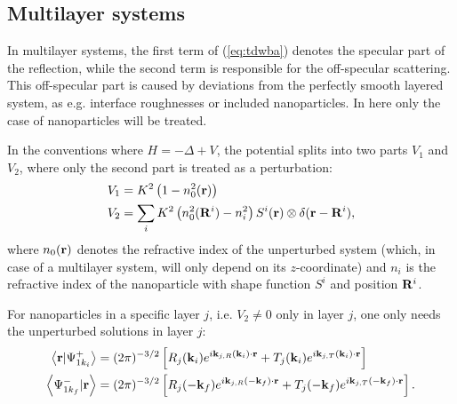 \subsection{Multilayer systems}

In multilayer systems, the first term of (\ref{eq:tdwba}) denotes the specular part of the reflection, while the second term is responsible for the off-specular scattering. This off-specular part is caused by deviations from the perfectly smooth layered system, as e.g. interface roughnesses or included nanoparticles. In here only the case of nanoparticles will be treated.

In the conventions where $H=-\Delta + V$, the potential splits into two parts $V_1$ and $V_2$, where only the second part is treated as a perturbation:
\begin{align*}
  V_1 & = K^2\left( 1-n_0^2(\mathbf{r})\right)  \\
  V_2 & = \sum_i K^2\left( n_0^2(\mathbf{R}^i) - n_i^2 \right) S^i(\mathbf{r}) \otimes \delta(\mathbf{r}-\mathbf{R}^i),
\end{align*}
where $n_0(\mathbf{r})$ denotes the refractive index of the unperturbed system (which, in case of a multilayer system, will only depend on its $z$-coordinate) and $n_i$ is the refractive index of the nanoparticle with shape function $S^i$ and position $\mathbf{R}^i$.

For nanoparticles in a specific layer $j$, i.e. $V_2\neq0$ only in layer $j$, one only needs the unperturbed solutions in layer $j$:
\begin{align*}
  \left\langle \mathbf{r} \vert \Psi^+_{1k_i} \right\rangle &= (2\pi)^{-3/2}\left[ R_j(\mathbf{k}_i) e^{i \mathbf{k}_{j,R}(\mathbf{k}_i)\cdot\mathbf{r}} + T_j(\mathbf{k}_i) e^{i \mathbf{k}_{j,T}(\mathbf{k}_i)\cdot\mathbf{r}} \right] \\
  \left\langle \Psi^-_{1k_f} \vert \mathbf{r} \right\rangle &= (2\pi)^{-3/2}\left[ R_j(-\mathbf{k}_f) e^{i \mathbf{k}_{j,R}(-\mathbf{k}_f)\cdot\mathbf{r}} + T_j(-\mathbf{k}_f) e^{i \mathbf{k}_{j,T}(-\mathbf{k}_f)\cdot\mathbf{r}} \right].
\end{align*}

